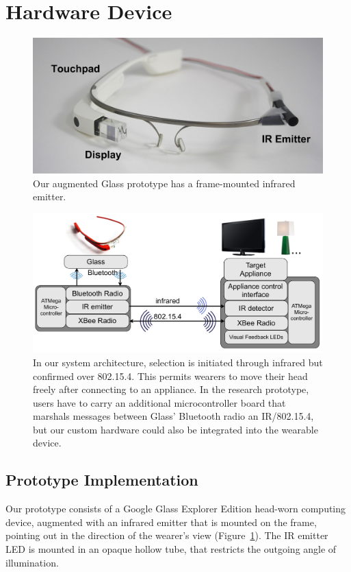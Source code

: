 

\section{Hardware Device}
\begin{figure}[t]
\centering
\includegraphics[width=1.0\columnwidth]{figures/glass-with-ir}
\caption{Our augmented Glass prototype has a frame-mounted infrared emitter.}
\label{fig:glass}
\end{figure}
\begin{figure}[t]
\centering
\includegraphics[width=1.0\columnwidth]{figures/architecture}
\caption{In our system architecture, selection is initiated through infrared but confirmed over 802.15.4. This permits wearers to move their head freely after connecting to an appliance. In the research prototype, users have to carry an additional microcontroller board that marshals messages between Glass' Bluetooth radio an IR/802.15.4, but our custom hardware could also be integrated into the wearable device.}
\label{fig:architecture}
\end{figure}

\subsection{Prototype Implementation}
Our prototype consists of a Google Glass Explorer Edition head-worn computing device, augmented with an infrared emitter that is mounted on the frame, pointing out in the direction of the wearer's view (Figure~\ref{fig:glass}). The IR emitter LED is mounted in an opaque hollow tube, that restricts the outgoing angle of illumination. 

